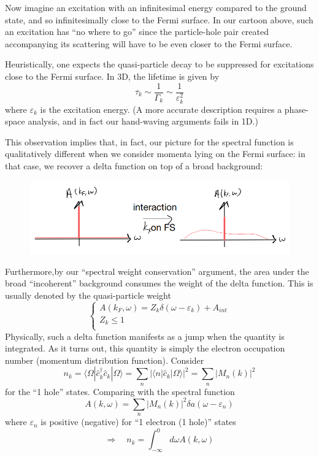 Now imagine an excitation with an infinitesimal energy compared to the ground state, and so infinitesimally close to the Fermi surface. In our cartoon above, such an excitation has ``no where to go'' since the particle-hole pair created accompanying its scattering will have to be even closer to the Fermi surface.

Heuristically, one expects the quasi-particle decay to be suppressed for excitations close to the Fermi surface. In 3D, the lifetime is given by
\[ \tau _k\sim \frac{1}{\Gamma _k}\sim \frac{1}{\varepsilon _{k}^{2}}\]
where $\varepsilon_k$ is the excitation energy. (A more accurate description requires a phase-space analysis, and in fact our hand-waving arguments fails in 1D.)

This observation implies that, in fact, our picture for the spectral function is qualitatively different when we consider momenta lying on the Fermi surface: in that case, we recover a delta function on top of a broad background:

\begin{figure}[ht]
    \centering
    \includegraphics[width=\textwidth]{jupyterbook/data/fig/lec16-fig04.png}
\end{figure}

Furthermore,by our ``spectral weight conservation'' argument, the area under the broad ``incoherent'' background consumes the weight of the delta function. This is usually denoted by the quasi-particle weight
\[ \begin{cases}
	A\left( k_F,\omega \right) =Z_k\delta \left( \omega -\varepsilon _k \right) +A_{int}\\
	Z_k\le 1\\
\end{cases}\]
Physically, such a delta function manifests as a jump when the quantity is integrated. As it turns out, this quantity is simply the electron occupation number (momentum distribution function). Consider
\[ n_k=\langle \Omega |\hat{c}_{k}^{\dagger}\hat{c}_k|\Omega \rangle =\sum_n{\left| \langle n|\hat{c}_k|\Omega \rangle \right|^2}=\sum_n{\left| M_n\left( k \right) \right|^2}\]
for the ``1 hole'' states. Comparing with the spectral function
\[ A\left( k,\omega \right) =\sum_n{\left| M_n\left( k \right) \right|^2\delta a\left( \omega -\varepsilon _n \right)}\]
where $\varepsilon_n$ is positive (negative) for ``1 electron (1 hole)'' states
\[ \Rightarrow \quad n_k=\int_{-\infty}^0{d\omega A\left( k,\omega \right)}\]

